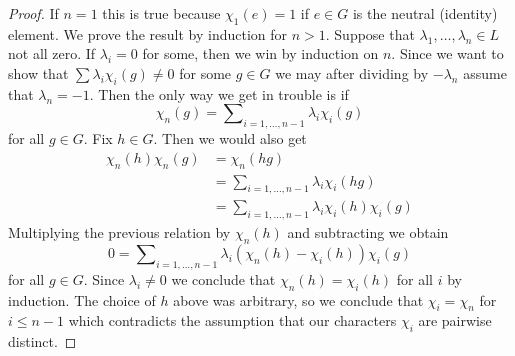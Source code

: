 \documentclass[10pt,a4paper]{amsart}
\theoremstyle{plain}
\theoremstyle{definition}
\theoremstyle{remark}
\numberwithin{equation}{subsection}
\begin{document}
\begin{proof}
If $n = 1$ this is true because $\chi_1(e) = 1$ if $e \in G$ is the
neutral (identity) element. We prove the result by induction for $n > 1$.
Suppose that $\lambda_1, \ldots, \lambda_n \in L$ not all zero.
If $\lambda_i = 0$ for some, then we win by induction on $n$.
Since we want to show that $\sum \lambda_i\chi_i(g) \not = 0$
for some $g \in G$ we may after dividing by $-\lambda_n$
assume that $\lambda_n = -1$. Then the only way we get in trouble
is if
$$
\chi_n(g) = \sum\nolimits_{i = 1, \ldots, n - 1} \lambda_i\chi_i(g)
$$
for all $g \in G$. Fix $h \in G$. Then we would also get
\begin{align*}
\chi_n(h)\chi_n(g) & = \chi_n(hg) \\
& = \sum\nolimits_{i = 1, \ldots, n - 1} \lambda_i\chi_i(hg) \\
& = \sum\nolimits_{i = 1, \ldots, n - 1} \lambda_i\chi_i(h) \chi_i(g)
\end{align*}
Multiplying the previous relation by $\chi_n(h)$ and subtracting we obtain
$$
0 = \sum\nolimits_{i = 1, \ldots, n - 1}
\lambda_i (\chi_n(h) - \chi_i(h)) \chi_i(g)
$$
for all $g \in G$. Since $\lambda_i \not = 0$ we conclude that
$\chi_n(h) = \chi_i(h)$ for all $i$ by induction.
The choice of $h$ above was arbitrary, so we conclude
that $\chi_i = \chi_n$ for $i \leq n - 1$ which contradicts
the assumption that our characters $\chi_i$ are pairwise distinct.
\end{proof}
\end{document}
